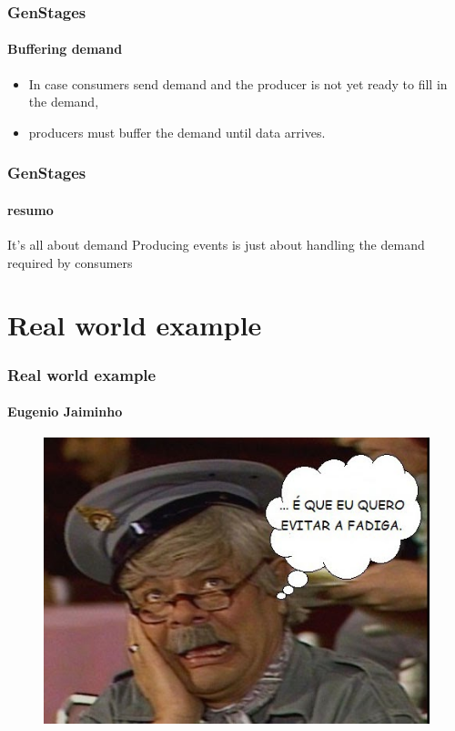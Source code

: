 \documentclass{beamer}
\begin{document}
  \begin{frame}
    \frametitle{GenStages}
    \framesubtitle{Buffering demand}
    
    \begin{itemize}[<+->]
      \item In case consumers send demand and the producer is not yet ready to fill in the demand,
      \item producers must buffer the demand until data arrives.
    \end{itemize}

  \end{frame}


  \begin{frame}
    \frametitle{GenStages}
    \framesubtitle{resumo}
    
    \begin{block}{It's all about demand}
    Producing events is just about handling the demand required by consumers
    \end{block}

  \end{frame}
  
  \section[Section]{Real world example}
      
  \begin{frame}
    \frametitle{Real world example}
    \framesubtitle{Eugenio Jaiminho}
    
     \begin{figure}[t]
     \includegraphics[scale=0.5]{img/jaiminho.png}
     \centering
     \end{figure}
     
  \end{frame}
\end{document}
